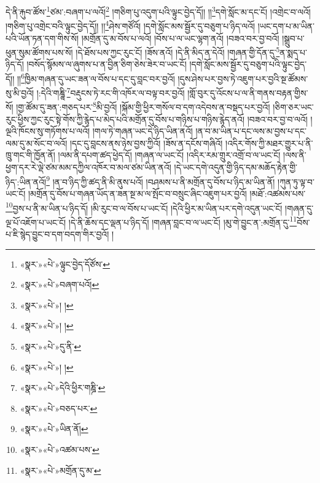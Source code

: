 དེ་ནི་རྐུབ་ཚོས་\footnote{«སྣར་»«པེ་»ལྟུང་བྱེད་དོཙོས་}ཙམ་:བཞག་པ་ལའོ།\footnote{«སྣར་»«པེ་»བཞག་པའོ།} །གཅིག་པུ་འདུག་པའི་ལྟུང་བྱེད་དོ།། །།\footnote{«སྣར་»«པེ་»། །}དགེ་སློང་མ་དང་ངོ། །འགྲེང་བ་ལའོ། །གཅིག་པུ་འགྲེང་བའི་ལྟུང་བྱེད་དོ།། །།\footnote{«སྣར་»«པེ་»། །}ཤེས་གཙོའོ། །དགེ་སློང་མས་སྦྱོར་དུ་བཅུག་པ་ཉིད་ལའོ། །ཡང་དག་པ་མ་ཡིན་པའི་ཡོན་ཏན་དག་གིས་སོ། །མགྲོན་དུ་མ་བོས་པ་ལའོ། །བོས་པ་ལ་ཡང་ལྷག་ནའོ། །བཟའ་བར་བྱ་བའོ། །སྒྲུབ་པ་ཕུན་སུམ་ཚོགས་པས་སོ། །དེ་ཐོས་པས་ཀྱང་རུང་ངོ། །ཟོས་ནའོ། །དེ་ནི་མིད་ན་དེའོ། །གཞན་གྱི་དོན་དུ་\footnote{«སྣར་»«པེ་»དུ་ནི་}ན་སྨད་པ་ཉིད་དོ། །བསོད་སྙོམས་ལ་ཞུགས་པ་ན་བྱིན་ཅིག་ཅེས་ཟེར་བ་ཡང་ངོ། །དགེ་སློང་མས་སྦྱོར་དུ་བཅུག་པའི་ལྟུང་བྱེད་དོ།། །།\footnote{«སྣར་»«པེ་»། །}ཁྱིམ་གཞན་དུ་ཡང་ཟན་ལ་བོས་པ་དང་དུ་བླང་བར་བྱའོ། །དུས་ཤེས་པར་བྱས་ཏེ་འཇུག་པར་བྱའི་སྔ་ཚོམས་སུ་མི་བྱའོ། །:དེའི་གཎྜཱི་\footnote{«སྣར་»«པེ་»དེའི་ཕྱིར་གཎྜི་}བརྡུངས་ཏེ་རང་གི་འཁོར་ལ་བལྟ་བར་བྱའོ། །གློ་བུར་དུ་འོངས་པ་ལ་ནི་གནས་བརྟན་གྱིས་སོ། །གྱ་ཚོམ་དུ་ཟན་:གཅད་པར་\footnote{«སྣར་»«པེ་»བཅད་པར་}མི་བྱའོ། །སྐོམ་གྱི་ཕྱིར་གསོལ་བ་དག་འདེབས་ན་བསྡད་པར་བྱའོ། །ཅིག་ཅར་ཡང་རུང་ཕྱིས་ཀྱང་རུང་སྟེ་གོས་ཀྱི་རྙེད་པ་མེད་པའི་མགྲོན་དུ་བོས་པ་གཉིས་པ་གཉིས་རྙེད་ནའོ། །བཟའ་བར་བྱ་བ་ལའོ། །ལྔའི་ཁོངས་སུ་གཏོགས་པ་ལའོ། །གལ་ཏེ་གཞན་ཡང་དེ་ཉིད་ཡིན་ནའོ། །ན་བ་མ་ཡིན་པ་དང་ལས་མ་བྱས་པ་དང་ལམ་དུ་མ་སོང་བ་ལའོ། །དང་དུ་བླངས་ནས་ཉེས་བྱས་ཀྱིའོ། །ཟོས་ན་དངོས་གཞིའོ། །འདིར་གོས་ཀྱི་མཐར་གྱུར་པ་ནི་ཁྲུ་གང་གི་ཁྱོན་ནོ། །ལམ་ནི་དཔག་ཚད་ཕྱེད་དོ། །གཞན་ལ་ཡང་ངོ། །འདིར་རམ་གྲུར་འགྲོ་བ་ལ་ཡང་ངོ། །ལས་ནི་ཕྱག་དར་རེ་ལྡེ་ཙམ་མམ་དཀྱིལ་འཁོར་བ་མལ་ཙམ་ཡིན་ནའོ། །དེ་ཡང་དགེ་འདུན་གྱི་ཉིད་དམ་མཆོད་རྟེན་གྱི་ཉིད་:ཡིན་ནའོ།\footnote{«སྣར་»«པེ་»ཡིན་ནོ།} །ན་བ་ཉིད་ཀྱི་ཚད་ནི་མི་ནུས་པའོ། །བཤམས་པ་ནི་མགྲོན་དུ་བོས་པ་ཉིད་མ་ཡིན་ནོ། །ཀུན་ཏུ་ལྟ་བ་ཡང་ངོ། །མགྲོན་དུ་བོས་པ་གཞན་ཡོད་ན་ཟན་སྔ་མ་ལ་སྤོང་བ་བསྲུང་ཞིང་འཇུག་པར་བྱའོ། །མཐོ་:འཚམས་པས་\footnote{«སྣར་»«པེ་»འཚམ་པས་}བྱས་པ་ནི་མ་ཡིན་པ་ཉིད་དོ། །མི་རུང་བ་ལ་བོས་པ་ཡང་ངོ། །དེའི་ཕྱིར་མ་ཡིན་པར་དགེ་འདུན་ཡང་ངོ། །གཞན་དུ་ལྔ་པོ་འཇོག་པ་ཡང་ངོ། །དེ་ནི་ཆོས་དང་ལྡན་པ་ཉིད་དོ། །གཞན་བླང་བ་ལ་ཡང་ངོ། །མུ་གེ་བྱུང་ན་:མགྲོན་དུ་\footnote{«སྣར་»«པེ་»མགྲོན་དུ་མ་}བོས་པ་ཇི་སྙེད་བྱུང་བ་དག་བདག་གིར་བྱའོ། །
